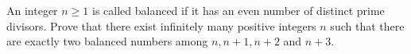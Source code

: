 An integer $n\ge 1$ is called balanced if it has an even number of distinct prime divisors. Prove that there exist infinitely many positive integers $n$ such that there are exactly two balanced numbers among $n,n+1,n+2$ and $n+3$.